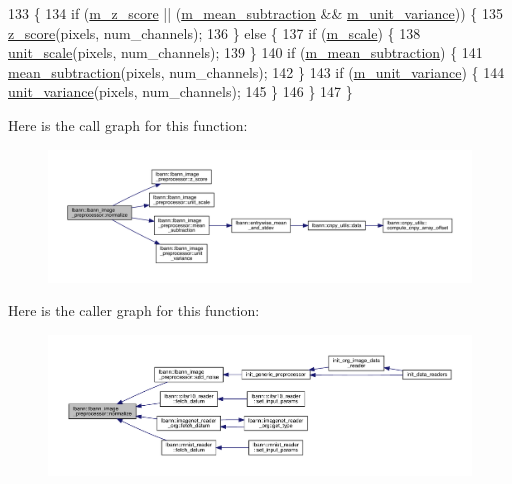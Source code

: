 \begin{DoxyCode}
133                                                                            \{
134   \textcolor{keywordflow}{if} (\hyperlink{classlbann_1_1lbann__image__preprocessor_a6abe54ada0cacf23e8ac8b6d113bd26b}{m\_z\_score} || (\hyperlink{classlbann_1_1lbann__image__preprocessor_a734002307d0ef95a31d75a295fa5c3d1}{m\_mean\_subtraction} && 
      \hyperlink{classlbann_1_1lbann__image__preprocessor_ae365a9e20f060b44de7835aceceb491c}{m\_unit\_variance})) \{
135     \hyperlink{classlbann_1_1lbann__image__preprocessor_a02cfd4d8c26a317540b587eb52cef0d5}{z\_score}(pixels, num\_channels);
136   \} \textcolor{keywordflow}{else} \{
137     \textcolor{keywordflow}{if} (\hyperlink{classlbann_1_1lbann__image__preprocessor_ae00af83d438ab27d6a7b996775fba3b3}{m\_scale}) \{
138       \hyperlink{classlbann_1_1lbann__image__preprocessor_aa7a8926d0544100f7d3caa9289d94826}{unit\_scale}(pixels, num\_channels);
139     \}
140     \textcolor{keywordflow}{if} (\hyperlink{classlbann_1_1lbann__image__preprocessor_a734002307d0ef95a31d75a295fa5c3d1}{m\_mean\_subtraction}) \{
141       \hyperlink{classlbann_1_1lbann__image__preprocessor_ab499dd9f11d98998b5902d639f70fa8e}{mean\_subtraction}(pixels, num\_channels);
142     \}
143     \textcolor{keywordflow}{if} (\hyperlink{classlbann_1_1lbann__image__preprocessor_ae365a9e20f060b44de7835aceceb491c}{m\_unit\_variance}) \{
144       \hyperlink{classlbann_1_1lbann__image__preprocessor_a05c4cb5cb842df5d46eebe15c6ea9de3}{unit\_variance}(pixels, num\_channels);
145     \}
146   \}
147 \}
\end{DoxyCode}
Here is the call graph for this function\+:\nopagebreak
\begin{figure}[H]
\begin{center}
\leavevmode
\includegraphics[width=350pt]{classlbann_1_1lbann__image__preprocessor_ae370cdc9f776ce8cce94a45cacf47425_cgraph}
\end{center}
\end{figure}
Here is the caller graph for this function\+:\nopagebreak
\begin{figure}[H]
\begin{center}
\leavevmode
\includegraphics[width=350pt]{classlbann_1_1lbann__image__preprocessor_ae370cdc9f776ce8cce94a45cacf47425_icgraph}
\end{center}
\end{figure}
